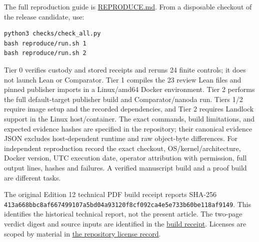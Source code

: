 \documentclass[11pt,letterpaper]{article}
\theoremstyle{definition}\newtheorem{definition}[theorem]{Definition}\newtheorem{example}[theorem]{Example}
\theoremstyle{remark}\newtheorem{remark}[theorem]{Remark}
\newcommand{\aud}[2]{\href{https://github.com/nousentllc/VP-VNP-Review/blob/567303d0bcf4f9d54390437b137752446e58ccd6/#1}{#2}}
\newcommand{\follow}[2]{\href{https://github.com/nousentllc/VP-VNP-Review/blob/8a7976933b6b2b4ffda1ad3a0dfb5fc6b6f023e8/#1}{#2}}
\begin{document}
The full reproduction guide is \follow{REPRODUCE.md}{REPRODUCE.md}. From a disposable checkout of the release candidate, use:
\begin{verbatim}
python3 checks/check_all.py
bash reproduce/run.sh 1
bash reproduce/run.sh 2
\end{verbatim}
Tier 0 verifies custody and stored receipts and reruns 24 finite controls; it does not launch Lean or Comparator. Tier 1 compiles the 23 review Lean files and pinned publisher imports in a Linux/amd64 Docker environment. Tier 2 performs the full default-target publisher build and Comparator/nanoda run. Tiers 1/2 require image setup and the recorded dependencies, and Tier 2 requires Landlock support in the Linux host/container. The exact commands, build limitations, and expected evidence hashes are specified in the repository; their canonical evidence JSON excludes host-dependent runtime and raw object-byte differences. For independent reproduction record the exact checkout, OS/kernel/architecture, Docker version, UTC execution date, operator attribution with permission, full output lines, hashes and failures. A verified manuscript build and a proof build are different tasks.

The original Edition 12 technical PDF build receipt reports SHA-256 \nolinkurl{413a668bbc8af667499107a5bd04a93120f8cf092ca4e5e733b60be118af9149}. This identifies the historical technical report, not the present article. The two-page verdict digest and source inputs are identified in the \aud{report/edition12-build.json}{build receipt}. Licenses are scoped by material in \follow{LICENSES/README.md}{the repository license record}.
\end{document}
